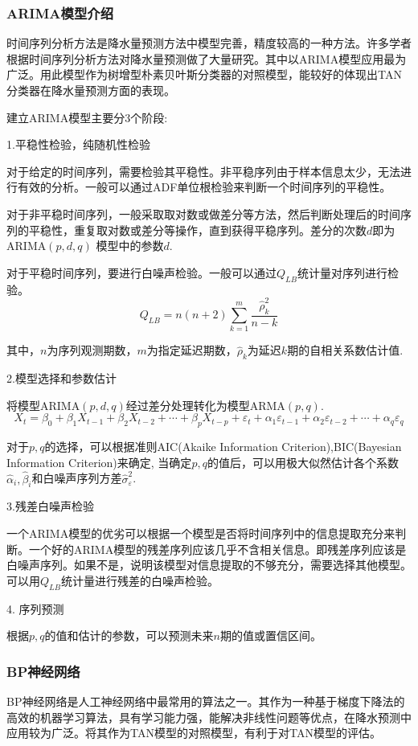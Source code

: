 \documentclass{ctexart}
\begin{document}
\subsubsection{ARIMA模型介绍}

时间序列分析方法是降水量预测方法中模型完善，精度较高的一种方法。许多学者根据时间序列分析方法对降水量预测做了大量研究。其中以ARIMA模型应用最为广泛。用此模型作为树增型朴素贝叶斯分类器的对照模型，能较好的体现出TAN分类器在降水量预测方面的表现。

建立ARIMA模型主要分3个阶段:

1.平稳性检验，纯随机性检验

对于给定的时间序列，需要检验其平稳性。非平稳序列由于样本信息太少，无法进行有效的分析。一般可以通过ADF单位根检验来判断一个时间序列的平稳性。

对于非平稳时间序列，一般采取取对数或做差分等方法，然后判断处理后的时间序列的平稳性，重复取对数或差分等操作，直到获得平稳序列。差分的次数$d$即为$\mathrm{ARIMA}(p,d,q)$ 模型中的参数$d$.

对于平稳时间序列，要进行白噪声检验。一般可以通过$Q_{LB}$统计量对序列进行检验。
$$Q_{LB}=n(n+2)\sum_{k=1}^{m}\frac{\hat{\rho}_{k}^{2}}{n-k}$$

其中，$n$为序列观测期数，$m$为指定延迟期数，$\hat{\rho}_{k}$为延迟$k$期的自相关系数估计值.

2.模型选择和参数估计

将模型ARIMA$(p,d,q)$经过差分处理转化为模型ARMA$(p,q)$.
$$X_{t}=\beta_{0}+\beta_{1}X_{t-1}+\beta_{2}X_{t-2}+\cdots+\beta_{p}X_{t-p}+\varepsilon_{t}+\alpha_{1}\varepsilon_{t-1}+\alpha_{2}\varepsilon_{t-2}+\cdots+\alpha_{q}\varepsilon_{q}$$

对于$p,q$的选择，可以根据准则AIC(Akaike Information Criterion),BIC(Bayesian Information Criterion)来确定,
当确定$p,q$的值后，可以用极大似然估计各个系数$\hat{\alpha}_{i},\hat{\beta}_{i}$和白噪声序列方差$\hat{\sigma}_{\varepsilon}^{2}$.

3.残差白噪声检验

    一个ARIMA模型的优劣可以根据一个模型是否将时间序列中的信息提取充分来判断。一个好的ARIMA模型的残差序列应该几乎不含相关信息。即残差序列应该是白噪声序列。如果不是，说明该模型对信息提取的不够充分，需要选择其他模型。可以用$Q_{LB}$统计量进行残差的白噪声检验。

4. 序列预测

     根据$p,q$的值和估计的参数，可以预测未来$n$期的值或置信区间。

\subsubsection{ BP神经网络}
       BP神经网络是人工神经网络中最常用的算法之一。其作为一种基于梯度下降法的高效的机器学习算法，具有学习能力强，能解决非线性问题等优点，在降水预测中应用较为广泛。将其作为TAN模型的对照模型，有利于对TAN模型的评估。
\end{document}

